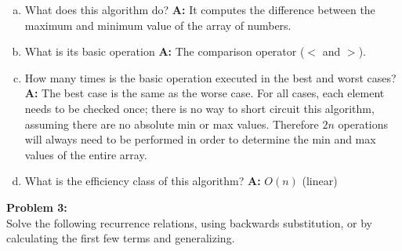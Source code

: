 \documentclass[11pt]{article}
\begin{document}
\begin{enumerate}[(a)]
\item What does this algorithm do? \textbf{A: } It computes the difference
between the maximum and minimum value of the array of numbers.
\item What is its basic operation \textbf{A: } The comparison operator ($<$ and $>$).
\item How many times is the basic operation executed in the best and 
worst cases? \textbf{A: } The best case is the same as the worse case. 
For all cases, each element needs to be checked once; there is no way to 
short circuit this algorithm, assuming there are no absolute min or max 
values. Therefore $2n$ operations will always need to be performed in 
order to determine the min and max values of the entire array. 
\item What is the efficiency class of this algorithm? \textbf{A: } 
$O(n)$ (linear)
\end{enumerate}
\noindent\textbf{Problem 3:}\\
Solve the following recurrence relations, using backwards substitution, 
or by calculating the first few terms and generalizing.
\end{document}
